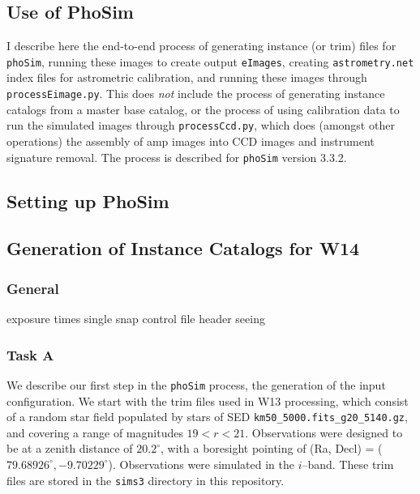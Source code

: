 \documentclass[prd, nofootinbib, floatfix, 11pt, tightenlines, times]{article}
\begin{document}
\clearpage
\begin{appendices}
\section{Use of PhoSim}

I describe here the end-to-end process of generating instance (or
trim) files for {\tt phoSim}, running these images to create output
{\tt eImages}, creating {\tt astrometry.net} index files for
astrometric calibration, and running these images through {\tt
  processEimage.py}.  This does {\it not} include the process of
generating instance catalogs from a master base catalog, or the
process of using calibration data to run the simulated images through
{\tt processCcd.py}, which does (amongst other operations) the
assembly of amp images into CCD images and instrument signature
removal.  The process is described for {\tt phoSim} version 3.3.2.

\subsection{Setting up PhoSim}

\subsection{Generation of Instance Catalogs for W14}

\subsubsection{General}
exposure times
single snap
control file
header
seeing

\subsubsection{Task A}

We describe our first step in the {\tt phoSim} process, the generation
of the input configuration.  We start with the trim files used in W13
processing, which consist of a random star field populated by stars of
SED {\tt km50\_5000.fits\_g20\_5140.gz}, and covering a range of
magnitudes $19 < r < 21$.  Observations were designed to be at a
zenith distance of $20.2^{\circ}$, with a boresight pointing of (Ra,
Decl) = ($79.68926^{\circ}, -9.70229^{\circ}$).  Observations were
simulated in the $i$--band.  These trim files are stored in the {\tt sims3}
directory in this repository.


\end{appendices}
\end{document}
